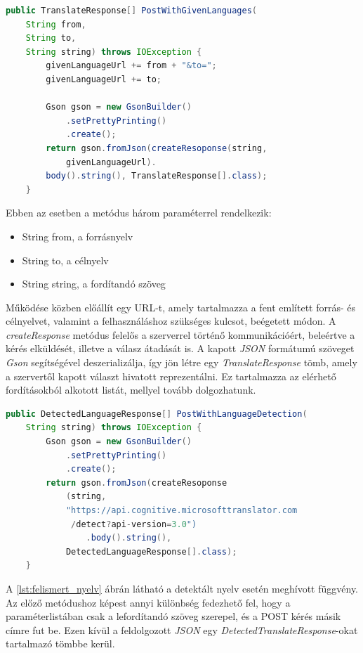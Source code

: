 \begin{lstlisting}[language=java, label={lst:adott_nyelv}]
public TranslateResponse[] PostWithGivenLanguages(
    String from,
    String to,
    String string) throws IOException {
        givenLanguageUrl += from + "&to=";
        givenLanguageUrl += to;

        Gson gson = new GsonBuilder()
            .setPrettyPrinting()
            .create();
        return gson.fromJson(createResoponse(string,
            givenLanguageUrl).
        body().string(), TranslateResponse[].class);
    }
\end{lstlisting}
Ebben az esetben a metódus három paraméterrel rendelkezik:
\begin{itemize}[noitemsep]
\item String from, a forrásnyelv
\item String to, a célnyelv
\item String string, a fordítandó szöveg
\end{itemize}
Működése közben előállít egy URL-t, amely tartalmazza a fent említett forrás- és célnyelvet, valamint a felhasználáshoz szükséges kulcsot, beégetett módon. A \textit{createResponse} metódus felelős a szerverrel történő kommunikációért, beleértve a kérés elküldését, illetve a válasz átadását is. A kapott \textit{JSON} formátumú szöveget \textit{Gson} segítségével deszerializálja, így jön létre egy \textit{TranslateResponse} tömb, amely a szervertől kapott választ hivatott reprezentálni. Ez tartalmazza az elérhető fordításokból alkotott listát, mellyel tovább dolgozhatunk.

\begin{lstlisting}[language=java, label={lst:felismert_nyelv}, showstringspaces=false]
public DetectedLanguageResponse[] PostWithLanguageDetection(
    String string) throws IOException {
        Gson gson = new GsonBuilder()
            .setPrettyPrinting()
            .create();
        return gson.fromJson(createResoponse
            (string,
            "https://api.cognitive.microsofttranslator.com
             /detect?api-version=3.0")
                .body().string(),
            DetectedLanguageResponse[].class);
    }
\end{lstlisting}
A \ref{lst:felismert_nyelv} ábrán látható a detektált nyelv esetén meghívott függvény. Az előző metódushoz képest annyi különbség fedezhető fel, hogy a paraméterlistában csak a lefordítandó szöveg szerepel, és a POST kérés másik címre fut be. Ezen kívül a feldolgozott \textit{JSON} egy \textit{DetectedTranslateResponse}-okat tartalmazó tömbbe kerül. 

